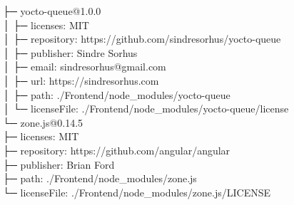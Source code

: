 ├─ yocto-queue@1.0.0\\
│  ├─ licenses: MIT\\
│  ├─ repository: https://github.com/sindresorhus/yocto-queue\\
│  ├─ publisher: Sindre Sorhus\\
│  ├─ email: sindresorhus@gmail.com\\
│  ├─ url: https://sindresorhus.com\\
│  ├─ path: ./Frontend/node\_modules/yocto-queue\\
│  └─ licenseFile: ./Frontend/node\_modules/yocto-queue/license\\
└─ zone.js@0.14.5\\
├─ licenses: MIT\\
├─ repository: https://github.com/angular/angular\\
├─ publisher: Brian Ford\\
├─ path: ./Frontend/node\_modules/zone.js\\
└─ licenseFile: ./Frontend/node\_modules/zone.js/LICENSE\\